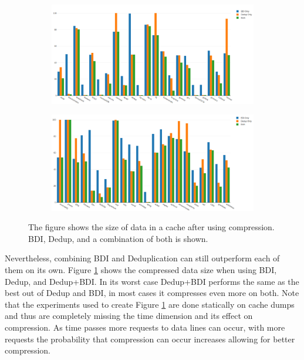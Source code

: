 \begin{figure}
    \begin{subfigure}[t]{\textwidth}
        \includegraphics[width=\textwidth]{CompSize1.png}
    \end{subfigure}
    \begin{subfigure}[b]{\textwidth}
        \includegraphics[width=\textwidth]{CompSize2.png}
    \end{subfigure}
    \caption[Size after compression]{The figure shows the size of data in a cache after using compression. BDI, Dedup, and a combination of both is shown.}
    \label{fig:CompSize}
\end{figure}
Nevertheless, combining BDI and Deduplication can still outperform each of them on its own. Figure \ref{fig:CompSize} shows the compressed data size when using BDI, Dedup, and Dedup+BDI. In its worst case Dedup+BDI performs the same as the best out of Dedup and BDI, in most cases it compresses even more on both. Note that the experiments used to create Figure \ref{fig:CompSize} are done statically on cache dumps and thus are completely missing the time dimension and its effect on compression. As time passes more requests to data lines can occur, with more requests the probability that compression can occur increases allowing for better compression.
